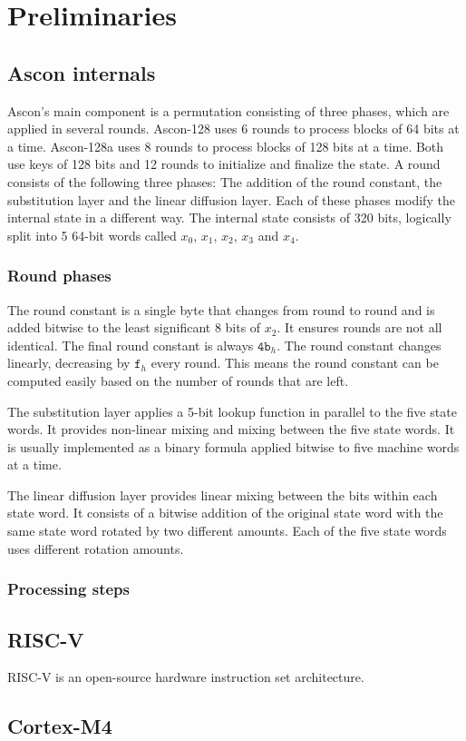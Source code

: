 \section{Preliminaries}

\subsection{Ascon internals}

Ascon's main component is a permutation consisting of three phases, which are
applied in several rounds. Ascon-128 uses 6 rounds to process blocks of 64 bits
at a time. Ascon-128a uses 8 rounds to process blocks of 128 bits at a time.
Both use keys of 128 bits and 12 rounds to initialize and finalize the state. A
round consists of the following three phases: The addition of the round
constant, the substitution layer and the linear diffusion layer. Each of these
phases modify the internal state in a different way. The internal state consists
of 320 bits, logically split into 5 64-bit words called $x_0$, $x_1$, $x_2$,
$x_3$ and $x_4$.

\subsubsection{Round phases}

The round constant is a single byte that changes from round to round and is
added bitwise to the least significant 8 bits of $x_2$. It ensures rounds are
not all identical. The final round constant is always $\mathtt{4b}_h$. The round
constant changes linearly, decreasing by $\mathtt{f}_h$ every round. This means
the round constant can be computed easily based on the number of rounds that are
left.

The substitution layer applies a 5-bit lookup function in parallel to the five
state words. It provides non-linear mixing and mixing between the five state
words. It is usually implemented as a binary formula applied bitwise to five
machine words at a time.

The linear diffusion layer provides linear mixing between the bits within each
state word. It consists of a bitwise addition of the original state word with
the same state word rotated by two different amounts. Each of the five state
words uses different rotation amounts.

\subsubsection{Processing steps}



\subsection{RISC-V}
RISC-V\cite{riscv} is an open-source hardware instruction set architecture.


\subsection{Cortex-M4}

